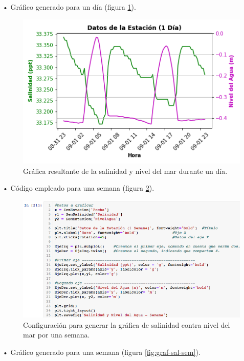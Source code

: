 \documentclass[12pt]{article}
\begin{document}
\noindent • Gráfico generado para un día (figura \ref{fig:graf-sal-dia}). \\

\begin{figure}[h!]
	\center
	\includegraphics[scale=.6]{Salinidad-y-Nivel-del-Agua-Dia}
	\caption{\label{fig:graf-sal-dia} Gráfica resultante de la salinidad y nivel del mar durante un día.}
\end{figure}

\noindent • Código empleado para una semana (figura \ref{fig:cod-sal-sem}). \\

\begin{figure}[h!]
	\center	
	\includegraphics[scale=.6]{./Images/sal-sem}
	\caption{\label{fig:cod-sal-sem} Configuración para generar la gráfica de salinidad contra nivel del mar por una semana.}
\end{figure}

\noindent • Gráfico generado para una semana (figura \ref{fig:graf-sal-sem}). \\
\end{document}
